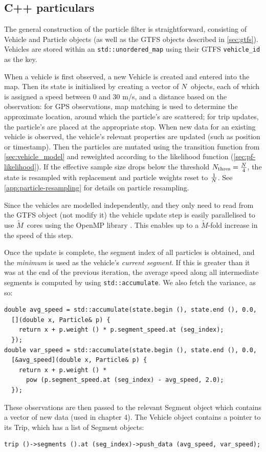 \subsection{C++ particulars}
\label{sec:pf_implementation}

The general construction of the particle filter is straightforward, consisting of Vehicle and Particle objects (as well as the GTFS objects described in \cref{sec:gtfs}). Vehicles are stored within an \verb+std::unordered_map+ using their GTFS \verb+vehicle_id+ as the key.

When a vehicle is first observed, a new Vehicle is created and entered into the map. Then its state is initialised by creating a vector of $N$  objects, each of which is assigned a speed between 0 and 30 m/s, and a distance based on the observation:
for GPS observations, map matching is used to determine the approximate location, around which the particle's are scattered;
for trip updates, the particle's are placed at the appropriate stop.
When new data for an existing vehicle is observed, the vehicle's relevant properties are updated (such as position or timestamp). Then the particles are mutated using the transition function from \cref{sec:vehicle_model} and reweighted according to the likelihood function (\cref{sec:pf-likelihood}). If the effective sample size drops below the threshold $N_\text{thres}=\frac{N}{4}$, the state is resampled with replacement and particle weights reset to $\frac{1}{N}$. See \cref{app:particle-resampling} for details on particle resampling.

Since the vehicles are modelled independently, and they only need to read from the GTFS object (not modify it) the vehicle update step is easily parallelised to use $\tilde M$~cores using the OpenMP library \citep{OMP}. This enables up to a $\tilde M$-fold increase in the speed of this step.

Once the update is complete, the segment index of all particles is obtained, and the \emph{minimum} is used as the vehicle's \emph{current segment}. If this is greater than it was at the end of the previous iteration, the average speed along all intermediate segments is computed by using \verb+std::accumulate+. We also fetch the variance, as so:
\begin{lstlisting}
double avg_speed = std::accumulate(state.begin (), state.end (), 0.0,
  [](double x, Particle& p) {
    return x + p.weight () * p.segment_speed.at (seg_index);
  });
double var_speed = std::accumulate(state.begin (), state.end (), 0.0,
  [&avg_speed](double x, Particle& p) {
    return x + p.weight () *
      pow (p.segment_speed.at (seg_index) - avg_speed, 2.0);
  });
\end{lstlisting}
These observations are then passed to the relevant Segment object which contains a vector of new data (used in chapter 4). The Vehicle object contains a pointer to its Trip, which has a list of Segment objects:
\begin{lstlisting}
trip ()->segments ().at (seg_index)->push_data (avg_speed, var_speed);
\end{lstlisting}

